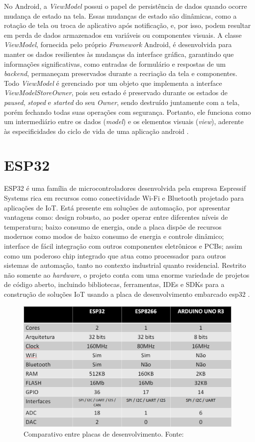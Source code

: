 No Android, a \textit{ViewModel} possui o papel de persistência de dados quando ocorre mudança 
de estado na tela. Essas mudanças de estado são dinâmicas, como a rotação de tela ou troca de aplicativo após notificação, e, por isso, 
podem resultar em perda de dados armazenados em variáveis ou componentes visuais. A classe \textit{ViewModel}, fornecida pelo próprio 
\textit{Framework} Android, é desenvolvida para manter os dados resilientes às mudanças da interface gráfica, garantindo que informações significativas, como entradas de 
formulário e respostas de um \textit{backend}, permaneçam preservados durante a recriação da tela e componentes. Todo \textit{ViewModel} é gerenciado por um objeto 
que implementa a interface \textit{ViewModelStoreOwner}, pois seu estado é preservado durante os estados de \textit{paused}, \textit{stoped} e \textit{started} do seu \textit{Owner}, sendo destruído
juntamente com a tela, porém fechando todas suas operações com segurança. Portanto, ele funciona como um intermediário entre os dados (\textit{model}) e
os elementos visuais (\textit{view}), aderente às especificidades do ciclo de vida de uma aplicação android \cite{google-developers-viewmodel}.

\section{ESP32}

ESP32 é uma família de microcontroladores desenvolvida pela empresa Espressif Systems rica em recursos como conectividade Wi-Fi e Bluetooth projetado para aplicações de IoT. 
Está presente em soluções de automação, por apresentar vantagens como: design robusto, ao poder operar entre diferentes níveis de temperatura; 
baixo consumo de energia, onde a placa dispõe de recursos modernos como modos de baixo consumo de energia e controle dinâmico; interface de fácil 
integração com outros componentes eletrônicos e PCBs; assim como um poderoso chip integrado que atua como processador para outros sistemas de automação, 
tanto no contexto industrial quanto residencial. Restrito não somente ao \textit{hardware}, o projeto conta com uma enorme variedade 
de projetos de código aberto, incluindo bibliotecas, ferramentas, IDEs e SDKs para a construção de soluções IoT usando a placa de desenvolvimento embarcado esp32 \cite{esp32-espressif-documentation}. 

\begin{figure}[ht]
    \centering
    \includegraphics[width=.57\textwidth]{img/esp32-comparation-table.png}
    \caption{Comparativo entre placas de desenvolvimento. Fonte: \cite{esp32-comparation-table}}\label{figTableEsp}
\end{figure}

